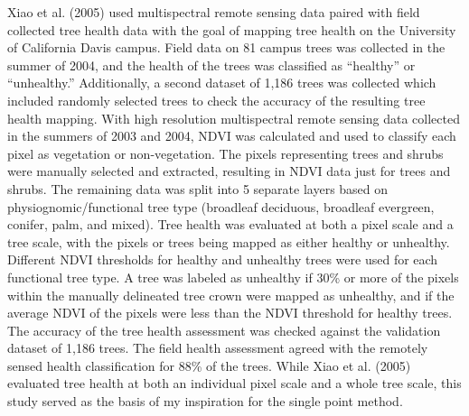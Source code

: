 \documentclass[12pt,twoside]{reedthesis}
\begin{document}
Xiao et al. (2005) used multispectral remote sensing data paired with field
collected tree health data with the goal of mapping tree health on the
University of California Davis campus. Field data on 81 campus trees was
collected in the summer of 2004, and the health of the trees was
classified as ``healthy'' or ``unhealthy.'' Additionally, a second dataset
of 1,186 trees was collected which included randomly selected trees to
check the accuracy of the resulting tree health mapping. With high
resolution multispectral remote sensing data collected in the summers of
2003 and 2004, NDVI was calculated and used to classify each pixel as
vegetation or non-vegetation. The pixels representing trees and shrubs
were manually selected and extracted, resulting in NDVI data just for
trees and shrubs. The remaining data was split into 5 separate layers
based on physiognomic/functional tree type (broadleaf deciduous,
broadleaf evergreen, conifer, palm, and mixed). Tree health was
evaluated at both a pixel scale and a tree scale, with the pixels or
trees being mapped as either healthy or unhealthy. Different NDVI
thresholds for healthy and unhealthy trees were used for each functional
tree type. A tree was labeled as unhealthy if 30\% or more of the pixels
within the manually delineated tree crown were mapped as unhealthy, and
if the average NDVI of the pixels were less than the NDVI threshold for
healthy trees. The accuracy of the tree health assessment was checked
against the validation dataset of 1,186 trees. The field health
assessment agreed with the remotely sensed health classification for 88\%
of the trees. While Xiao et al. (2005) evaluated tree health at both an
individual pixel scale and a whole tree scale, this study served as the
basis of my inspiration for the single point method.
\end{document}
